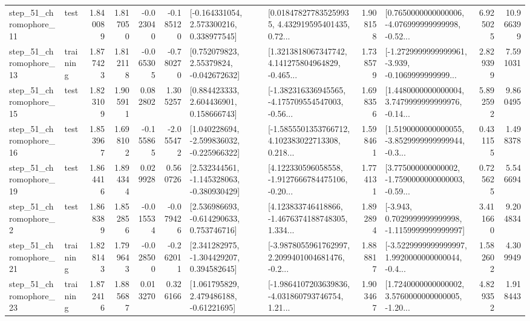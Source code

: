 \begin{tabular}{llrrrrllrlrr}
   step\_51\_chromophore\_11 &      test &      1.840089 &    1.817050 &     -0.023040 & -0.185120 &    [-0.164331054, 2.573300216, 0.338977545] &  [0.018478277835259935, 4.432919595401435, 0.72... &       1.908158 &  [0.7650000000000006, -4.076999999999998, -0.52... &            6.925025 &         10.966399 \\
   step\_51\_chromophore\_13 &  training &      1.877423 &    1.812118 &     -0.065305 & -0.780270 &     [0.752079823, 2.55379824, -0.042672632] &  [1.3213818067347742, 4.141275804964829, -0.465... &       1.738579 &  [-1.2729999999999961, -3.939, -0.1069999999999... &            2.829399 &          7.591031 \\
   step\_51\_chromophore\_15 &      test &      1.823109 &    1.905911 &      0.082802 &  1.305257 &     [0.884423333, 2.604436901, 0.158666743] &  [-1.382316336945565, -4.175709554547003, -0.56... &       1.698356 &  [1.4480000000000004, 3.7479999999999976, -0.14... &            5.892592 &          9.860495 \\
   step\_51\_chromophore\_16 &      test &      1.853967 &    1.698102 &     -0.155865 & -2.055472 &   [1.040228694, -2.599836032, -0.225966322] &  [-1.5855501353766712, 4.102383022713308, 0.218... &       1.598461 &  [1.5190000000000055, -3.8529999999999944, -0.3... &            0.431155 &          1.498378 \\
   step\_51\_chromophore\_19 &      test &      1.864416 &    1.894344 &      0.029928 &  0.560726 &   [2.532344561, -1.145328063, -0.380930429] &  [4.122330596058558, -1.9127666784475106, -0.20... &       1.774131 &  [3.775000000000002, -1.7590000000000003, -0.59... &            0.725625 &          5.546694 \\
    step\_51\_chromophore\_2 &      test &      1.868389 &    1.852856 &     -0.015534 & -0.079426 &    [2.536986693, -0.614290633, 0.753746716] &  [4.123833746418866, -1.4676374188748305, 1.334... &       1.892894 &  [-3.943, 0.7029999999999998, -1.1159999999999997] &            3.411660 &          9.204834 \\
   step\_51\_chromophore\_21 &  training &      1.828143 &    1.799643 &     -0.028500 & -0.262011 &    [2.341282975, -1.304429207, 0.394582645] &  [-3.9878055961762997, 2.2099401004681476, -0.2... &       1.888817 &  [-3.5229999999999997, 1.9920000000000044, -0.4... &            1.582602 &          4.309949 \\
   step\_51\_chromophore\_23 &  training &      1.872416 &    1.885687 &      0.013270 &  0.326166 &     [1.061795829, 2.479486188, -0.61221695] &  [-1.9864107203639836, -4.031860793746754, 1.21... &       1.903467 &  [1.7240000000000002, 3.5760000000000005, -1.20... &            4.829352 &          1.918443 \\

\end{tabular}
